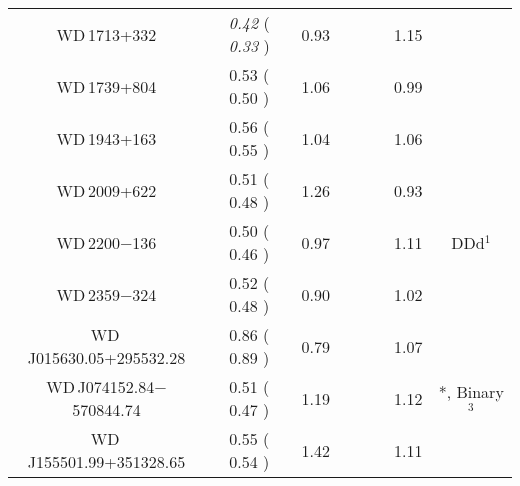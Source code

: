 \documentclass[fleqn,usenatbib, useAMS]{mnras}
\newcommand{\xmark}{\ding{53}}%
\newcommand{\Y}{\checkmark}%
\newcommand{\N}{\xmark}%
\begin{document}
\begin{table*}
\begin{tabular}{cccccccc}
WD\,1713+332	&	\textit{0.42}	(	\textit{0.33}	)	&	0.93	&	\Y	&	\N	&	\N	&	1.15	&		\\
WD\,1739+804	&	0.53	(	0.50	)	&	1.06	&	\Y	&	\Y	&	\N	&	0.99	&		\\
WD\,1943+163	&	0.56	(	0.55	)	&	1.04	&	\Y	&	\N	&	\N	&	1.06	&		\\
WD\,2009+622	&	0.51	(	0.48	)	&	1.26	&	\Y	&	\Y	&	\N	&	0.93	&		\\
WD\,2200$-$136	&	0.50	(	0.46	)	&	0.97	&	\Y	&	\Y	&	\N	&	1.11	&	DDd$^1$	\\

WD\,2359$-$324	&	0.52	(	0.48	)	&	0.90	&	\Y	&	\Y	&	\N	&	1.02	&		\\
WD\,J015630.05+295532.28 & 0.86 ( 0.89 ) & 0.79 & \N & \Y & \N & 1.07 & \\
WD\,J074152.84$-$570844.74	&	0.51	(	0.47	)	&	1.19	&	\N	&	\N	&	\Y	&	1.12	&	*, Binary$^3$ 	\\
WD\,J155501.99+351328.65	&	0.55	(	0.54	)	&	1.42	&	\Y	&	\Y	&	\N	&	1.11	&		\\


\end{tabular}
\end{table*}
\end{document}
